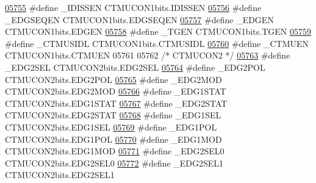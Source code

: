 \begin{DoxyCode}
\hypertarget{a00009_source_l05755}{}\hyperlink{a00009_ae86b0aede94b3059d5b1097776ff4955}{05755} \textcolor{preprocessor}{#define \_IDISSEN CTMUCON1bits.IDISSEN}
\hypertarget{a00009_source_l05756}{}\hyperlink{a00009_a6552e0c8f8fb5d3cf02f729fc6ad6d41}{05756} \textcolor{preprocessor}{#define \_EDGSEQEN CTMUCON1bits.EDGSEQEN}
\hypertarget{a00009_source_l05757}{}\hyperlink{a00009_a3a4786ccebe073dd9f50edf281867a45}{05757} \textcolor{preprocessor}{#define \_EDGEN CTMUCON1bits.EDGEN}
\hypertarget{a00009_source_l05758}{}\hyperlink{a00009_af6e0d28424a8fcc7f1e891561627446f}{05758} \textcolor{preprocessor}{#define \_TGEN CTMUCON1bits.TGEN}
\hypertarget{a00009_source_l05759}{}\hyperlink{a00009_a256e35c44b80322d6cad2c22961473f3}{05759} \textcolor{preprocessor}{#define \_CTMUSIDL CTMUCON1bits.CTMUSIDL}
\hypertarget{a00009_source_l05760}{}\hyperlink{a00009_a3c81a1dad8cf8e2172cf32abd8dc5c32}{05760} \textcolor{preprocessor}{#define \_CTMUEN CTMUCON1bits.CTMUEN}
05761 
05762 \textcolor{comment}{/* CTMUCON2 */}
\hypertarget{a00009_source_l05763}{}\hyperlink{a00009_ab424d579c9f7692e9ef780eb0ca1e57b}{05763} \textcolor{preprocessor}{#define \_EDG2SEL CTMUCON2bits.EDG2SEL}
\hypertarget{a00009_source_l05764}{}\hyperlink{a00009_a7487b99f0c40afa73a7f1ce3cf7a689c}{05764} \textcolor{preprocessor}{#define \_EDG2POL CTMUCON2bits.EDG2POL}
\hypertarget{a00009_source_l05765}{}\hyperlink{a00009_a27fef9c91a5e316d9659df86747b3f31}{05765} \textcolor{preprocessor}{#define \_EDG2MOD CTMUCON2bits.EDG2MOD}
\hypertarget{a00009_source_l05766}{}\hyperlink{a00009_aa1b8c4a05816fe8b5d8ba0cfea2d3080}{05766} \textcolor{preprocessor}{#define \_EDG1STAT CTMUCON2bits.EDG1STAT}
\hypertarget{a00009_source_l05767}{}\hyperlink{a00009_a2e76b281b956025dd136e5e18e0bc753}{05767} \textcolor{preprocessor}{#define \_EDG2STAT CTMUCON2bits.EDG2STAT}
\hypertarget{a00009_source_l05768}{}\hyperlink{a00009_aa988f8c4c00ead61ef083b553e22577a}{05768} \textcolor{preprocessor}{#define \_EDG1SEL CTMUCON2bits.EDG1SEL}
\hypertarget{a00009_source_l05769}{}\hyperlink{a00009_a2299024a1b158ed63fd7950196635cd4}{05769} \textcolor{preprocessor}{#define \_EDG1POL CTMUCON2bits.EDG1POL}
\hypertarget{a00009_source_l05770}{}\hyperlink{a00009_a98d5f6d14755f3b9be7fb19198614552}{05770} \textcolor{preprocessor}{#define \_EDG1MOD CTMUCON2bits.EDG1MOD}
\hypertarget{a00009_source_l05771}{}\hyperlink{a00009_a60ab718c93c5b6aaf74a19ab0b181244}{05771} \textcolor{preprocessor}{#define \_EDG2SEL0 CTMUCON2bits.EDG2SEL0}
\hypertarget{a00009_source_l05772}{}\hyperlink{a00009_a1232812f0bb95bf20bf0b169c371a277}{05772} \textcolor{preprocessor}{#define \_EDG2SEL1 CTMUCON2bits.EDG2SEL1}

\end{DoxyCode}
